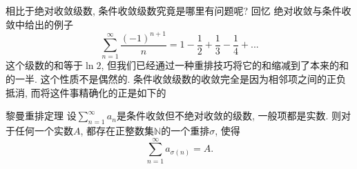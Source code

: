 

相比于绝对收敛级数, 条件收敛级数究竟是哪里有问题呢? 回忆 绝对收敛与条件收敛中给出的例子
$$
\sum_{n=1}^\infty\frac{(-1)^{n+1}}{n}
=1-\frac{1}{2}+\frac{1}{3}-\frac{1}{4}+...
$$
这个级数的和等于$\ln2$, 但我们已经通过一种重排技巧将它的和缩减到了本来的和的一半. 这个性质不是偶然的. 条件收敛级数的收敛完全是因为相邻项之间的正负抵消, 而将这件事精确化的正是如下的

\begin{theorem}{黎曼重排定理}
设$\sum_{n=1}^\infty a_n$是条件收敛但不绝对收敛的级数, 一般项都是实数. 则对于任何一个实数$A$, 都存在正整数集$\mathbb{N}$的一个重排$\sigma$, 使得
$$
\sum_{n=1}^\infty a_{\sigma(n)}=A.
$$
\end{theorem}